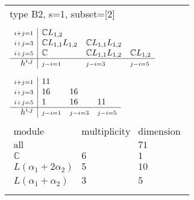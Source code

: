 \documentclass[crop,border=2mm]{standalone}
\begin{document}
\begin{tabular}{l}
{\huge type B2, s=1, subset=[2]}\\ \\


$\displaystyle
\begin{array}{r|l l l}
	{\scriptstyle i+j=1}&\mathbb{C}L_{1,2}&&\\
	{\scriptstyle i+j=3}&\mathbb{C}L_{1,1}L_{1,2}&\mathbb{C}L_{1,1}L_{1,2}&\\
	{\scriptstyle i+j=5}&\mathbb{C}&\mathbb{C}L_{1,1}L_{1,2}&\mathbb{C}L_{1,2}\\
	\hline h^{i,j}&{\scriptstyle j-i=1}&{\scriptstyle j-i=3}&{\scriptstyle j-i=5}
\end{array}
$ \\ \\


$\displaystyle
\begin{array}{r|l l l}
	{\scriptstyle i+j=1}&11&&\\
	{\scriptstyle i+j=3}&16&16&\\
	{\scriptstyle i+j=5}&1&16&11\\
	\hline h^{i,j}&{\scriptstyle j-i=1}&{\scriptstyle j-i=3}&{\scriptstyle j-i=5}
\end{array}
$ \\ \\


$\displaystyle
\begin{array}{rll}
	\text{module}&\text{multiplicity}&\text{dimension} \\ \hline \text{all}&&71 \\
	\mathbb{C}&6&1\\
	L\left(\alpha_{1}+ 2\alpha_{2}\right)&5&10\\
	L\left(\alpha_{1}+\alpha_{2}\right)&3&5
\end{array}
$ \\ \\

\end{tabular}
\end{document}
